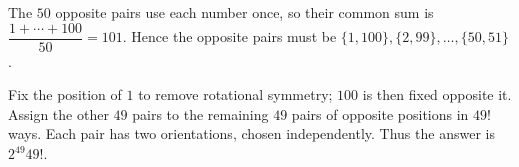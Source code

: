 The $50$ opposite pairs use each number once, so their common sum is $\dfrac{1+\cdots+100}{50}=101$. Hence the opposite pairs must be $\{1,100\},\{2,99\},\ldots,\{50,51\}$.

Fix the position of $1$ to remove rotational symmetry; $100$ is then fixed opposite it. Assign the other $49$ pairs to the remaining $49$ pairs of opposite positions in $49!$ ways. Each pair has two orientations, chosen independently. Thus the answer is $\boxed{2^{49}49!}$.
